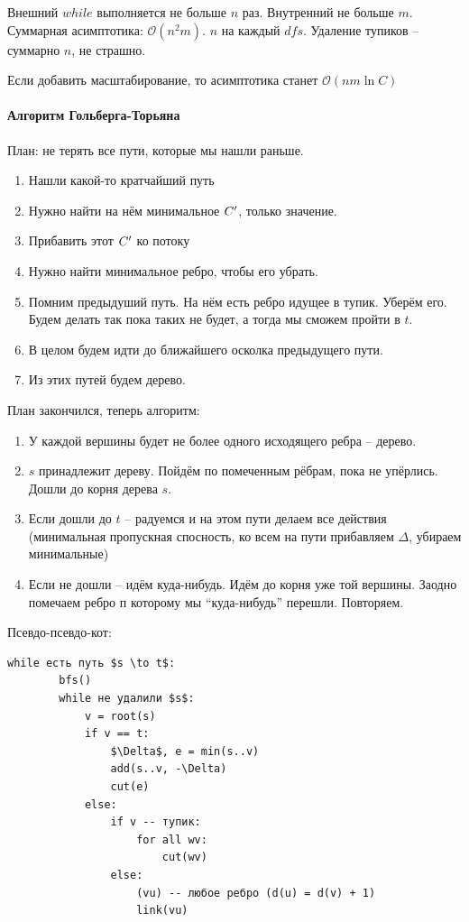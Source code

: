 Внешний $while$ выполняется не больше $n$ раз. Внутренний не больше $m$. 
Суммарная асимптотика: $\mathcal{O}(n^2m)$. $n$ на каждый $dfs$. Удаление тупиков -- суммарно $n$, не страшно.

Если добавить масштабирование, то асимптотика станет $\mathcal{O}(nm \ln C)$

\paragraph{Алгоритм Гольберга-Торьяна}
План: не терять все пути, которые мы нашли раньше.

\begin{enumerate}
    \item Нашли какой-то кратчайший путь
    \item Нужно найти на нём минимальное $C^{\prime}$, только значение.
    \item Прибавить этот $C^{\prime}$ ко потоку 
    \item Нужно найти минимальное ребро, чтобы его убрать.
    \item Помним предыдуший путь. На нём есть ребро идущее в тупик. Уберём его. Будем делать так пока таких не будет, а тогда мы сможем пройти в $t$. 
    \item В целом будем идти до ближайшего осколка предыдущего пути.
    \item Из этих путей будем дерево.
\end{enumerate}

План закончился, теперь алгоритм:
\begin{enumerate}
    \item У каждой вершины будет не более одного исходящего ребра -- дерево.
    \item $s$ принадлежит дереву. Пойдём по помеченным рёбрам, пока не упёрлись. Дошли до корня дерева $s$.
    \item Если дошли до $t$ -- радуемся и на этом пути делаем все действия (минимальная пропускная спосность, ко всем на пути прибавляем $\Delta$, убираем минимальные)
    \item Если не дошли -- идём куда-нибудь. Идём до корня уже той вершины. Заодно помечаем ребро п которому мы ``куда-нибудь'' перешли. Повторяем.
\end{enumerate}

Псевдо-псевдо-кот:
\begin{lstlisting}[mathescape=true]
    while есть путь $s \to t$:
        bfs()
        while не удалили $s$:
            v = root(s)
            if v == t:
                $\Delta$, e = min(s..v)
                add(s..v, -\Delta)
                cut(e)
            else:
                if v -- тупик:
                    for all wv:
                        cut(wv)
                else:
                    (vu) -- любое ребро (d(u) = d(v) + 1)
                    link(vu)       
\end{lstlisting}

